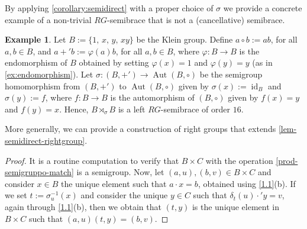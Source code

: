 \documentclass[11pt]{amsart}
\newcommand{\Sym}{\operatorname{Sym}}
\newcommand{\Aut}{\operatorname{Aut}}
\newcommand{\id}{\operatorname{id}}
\newtheorem{lemma}[theorem]{Lemma}
\theoremstyle{definition}
\newtheorem{Ex}[theorem]{Example}
\begin{document}
\smallskip

By applying \cref{corollary:semidirect} with a proper choice of $\sigma$ we provide a concrete example of a non-trivial $RG$-semibrace that is not a (cancellative) semibrace.
\begin{Ex}
Let $B:= \{1,\,x,\,y,\,xy\}$ be the Klein group. %
Define $a\circ b:= ab$, for all $a,b\in B$, and 
$a+'b:= \varphi(a)b$, for all $a, b \in B$, where 
${\varphi}:B\to B$ is the endomorphism of $B$ obtained by setting ${\varphi}(x) = 1$ and ${\varphi}(y) = y$ (as in \cref{ex:endomorphism}). Let $\sigma:\left(B, +'\right) \to \Aut(B,\circ)$ be the semigroup homomorphism from $(B,+')$ to $\Aut(B,\circ)$ given by $\sigma(x):= \id_B$ and $\sigma(y):= f$, where $f:B\to B$ is the automorphism of $(B,\circ)$ given by $f(x)=y$ and $f(y)=x$. Hence, $B\rtimes_{\sigma} B$ is a left $RG$-semibrace of order $16$.
\end{Ex}

\medskip
  
More generally, we can provide a construction of right groups that extends \cref{lem-semidirect-rightgroup}.
    \begin{proof}
       It is a routine computation to verify that $B \times C$ with the operation \eqref{prod-semigruppo-match} is a semigroup. Now, let $(a,u),(b,v) \in B \times C$
       and consider $x\in B$ the unique element such that $a\cdot x = b$, obtained using \cref{1.1}(b).
       If we set $t:= \sigma^{-1}_u(x)$ and consider the unique $y\in C$ such that $\delta_t(u) \cdot' y=v$, again through \cref{1.1}(b), then we obtain that $(t, y)$ is the unique element in $B\times C$ such that $(a,u)(t,y) = (b,v)$. 
    \end{proof}
\end{document}
